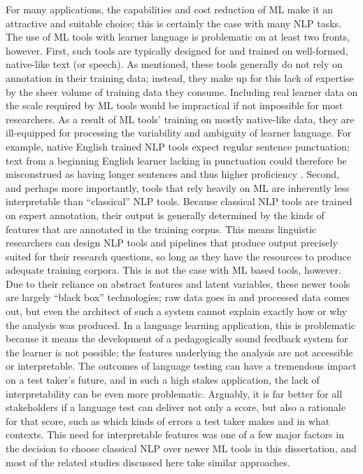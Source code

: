 For many applications, the capabilities and cost reduction of ML make it an attractive and suitable choice; this is certainly the case with many NLP tasks. The use of ML tools with learner language is problematic on at least two fronts, however. First, such tools are typically designed for and trained on well-formed, native-like text (or speech). As mentioned, these tools generally do not rely on annotation in their training data; instead, they make up for this lack of expertise by the sheer volume of training data they consume. Including real learner data on the scale required by ML tools would be impractical if not impossible for most researchers. As a result of ML tools' training on mostly native-like data, they are ill-equipped for processing the variability and ambiguity of learner language. For example, native English trained NLP tools expect regular sentence punctuation; text from a beginning English learner lacking in punctuation could therefore be misconstrued as having longer sentences and thus higher proficiency \cite{MeurersDickinson2017}. Second, and perhaps more importantly, tools that rely heavily on ML are inherently less interpretable than ``classical'' NLP tools. Because classical NLP tools are trained on expert annotation, their output is generally determined by the kinds of features that are annotated in the training corpus. This means linguistic researchers can design NLP tools and pipelines that produce output precisely suited for their research questions, so long as they have the resources to produce adequate training corpora. This is not the case with ML based tools, however. Due to their reliance on abstract features and latent variables, these newer tools are largely ``black box'' technologies; raw data goes in and processed data comes out, but even the architect of such a system cannot explain exactly how or why the analysis was produced. In a language learning application, this is problematic because it means the development of a pedagogically sound feedback system for the learner is not possible; the features underlying the analysis are not accessible or interpretable. The outcomes of language testing can have a tremendous impact on a test taker's future, and in such a high stakes application, the lack of interpretability can be even more problematic. Arguably, it is far better for all stakeholders if a language test can deliver not only a score, but also a rationale for that score, such as which kinds of errors a test taker makes and in what contexts. This need for interpretable features was one of a few major factors in the decision to choose classical NLP over newer ML tools in this dissertation, and most of the related studies discussed here take similar approaches.


